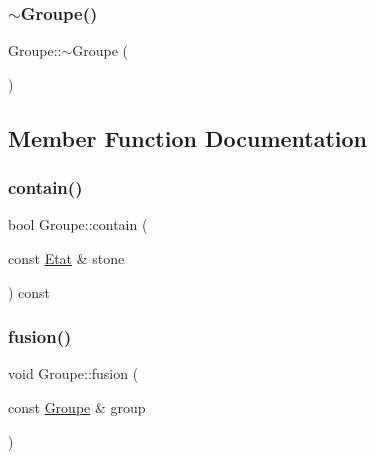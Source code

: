 \mbox{\label{class_groupe_a99dd414922635dcc0585aabb2a330f63}} 
\subsubsection{\texorpdfstring{$\sim$\+Groupe()}{~Groupe()}}
{\footnotesize\ttfamily Groupe\+::$\sim$\+Groupe (\begin{DoxyParamCaption}{ }\end{DoxyParamCaption})}



\subsection{Member Function Documentation}
\mbox{\label{class_groupe_aa8fa9be4c3edb6e1ec436dbefb7018f9}} 
\subsubsection{\texorpdfstring{contain()}{contain()}}
{\footnotesize\ttfamily bool Groupe\+::contain (\begin{DoxyParamCaption}\item[{const \hyperlink{class_etat}{Etat} \&}]{stone }\end{DoxyParamCaption}) const}

\mbox{\label{class_groupe_a4d3e09aee8899dd93c37b5a35a191e2e}} 
\subsubsection{\texorpdfstring{fusion()}{fusion()}}
{\footnotesize\ttfamily void Groupe\+::fusion (\begin{DoxyParamCaption}\item[{const \hyperlink{class_groupe}{Groupe} \&}]{group }\end{DoxyParamCaption})}

\mbox{\label{class_groupe_a51ae2500f67ac071215ba3ff49e91b17}} 
